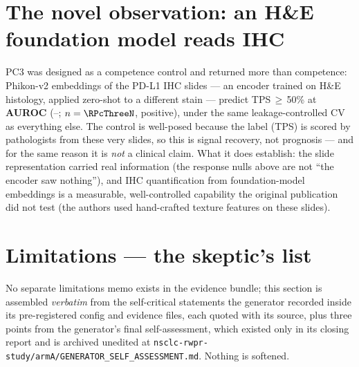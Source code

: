 \documentclass[11pt,a4paper]{article}
\begin{document}
\begin{center}
\footnotesize

\end{center}

\section{The novel observation: an H\&E foundation model reads IHC}

PC3 was designed as a competence control and returned more than competence: Phikon-v2
embeddings of the PD-L1 IHC slides --- an encoder trained on H\&E histology, applied zero-shot
to a different stain --- predict TPS\,$\geq$\,50\% at \textbf{AUROC \RPcThreeAuroc}
(\RPcThreeLo--\RPcThreeHi; $n=\RPcThreeN$, \RPcThreePos{} positive), under the same
leakage-controlled CV as everything else. The control is well-posed because the label (TPS) is
scored by pathologists from these very slides, so this is signal recovery, not prognosis ---
and for the same reason it is \emph{not} a clinical claim. What it does establish: the slide
representation carried real information (the response nulls above are not ``the encoder saw
nothing''), and IHC quantification from foundation-model embeddings is a measurable,
well-controlled capability the original publication did not test (the authors used
hand-crafted texture features on these slides).

\section{Limitations --- the skeptic's list}

No separate limitations memo exists in the evidence bundle; this section is assembled
\emph{verbatim} from the self-critical statements the generator recorded inside its
pre-registered config and evidence files, each quoted with its source, plus three points
from the generator's final self-assessment, which existed only in its closing report and
is archived unedited at \texttt{nsclc-rwpr-study/armA/GENERATOR\_SELF\_ASSESSMENT.md}.
Nothing is softened.
\end{document}
